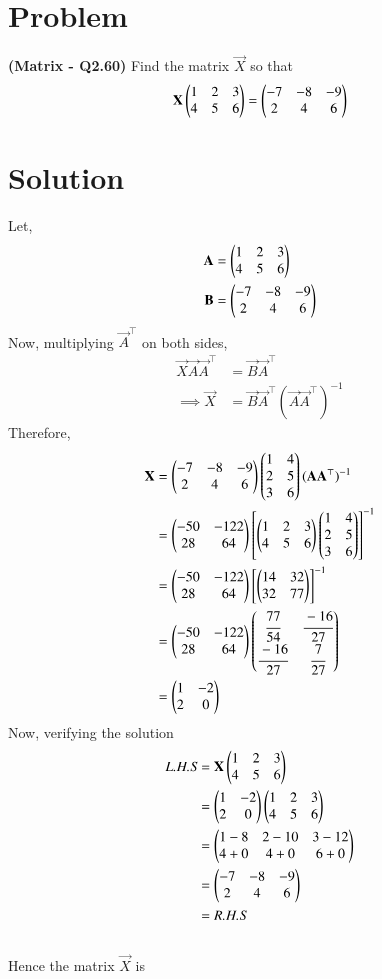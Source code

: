 \documentclass[journal,12pt,twocolumn]{IEEEtran}
\begin{document}
\section*{\textbf{Problem}}
\textbf{(Matrix - Q2.60)} Find the matrix $\vec{X}$ so that 
$$\mathbf{X}\begin{pmatrix}1 & 2 & 3\\ 4 & 5 & 6\end{pmatrix} = \begin{pmatrix}-7 & -8 & -9\\ 2 & 4 &6\end{pmatrix}$$
\section*{\textbf{Solution}}
Let,
\begin{align}
    \mathbf{A} &= \begin{pmatrix}1 & 2 & 3\\ 4 & 5 & 6\end{pmatrix}\\
    \mathbf{B} &= \begin{pmatrix}-7 & -8 & -9\\ 2 & 4 & 6\end{pmatrix}
\end{align}
Now, multiplying $\vec{A}^\top$ on both sides,
\begin{align}
    \vec{X}\vec{A}\vec{A}^\top &= \vec{B}\vec{A}^\top\\
   \implies \vec{X} &= \vec{B}\vec{A}^\top(\vec{A}\vec{A}^\top)^{-1}
\end{align}
Therefore,
\begin{align}
    \mathbf{X} &= \begin{pmatrix}-7 & -8 & -9\\ 2 & 4 & 6\end{pmatrix} \begin{pmatrix}1 & 4\\2 & 5\\3 & 6\end{pmatrix}(\mathbf{A}\mathbf{A}^\top)^{-1}\\
            &= \begin{pmatrix}-50 & -122\\ 28 & 64\end{pmatrix} \left[\begin{pmatrix}1 & 2 & 3\\ 4 & 5 & 6\end{pmatrix} \begin{pmatrix}1 & 4\\2 & 5\\3 & 6\end{pmatrix}\right]^{-1}\\
            &= \begin{pmatrix}-50 & -122\\ 28 & 64\end{pmatrix}\left[\begin{pmatrix}14 & 32\\32 & 77\end{pmatrix}\right]^{-1}\\
            &= \begin{pmatrix}-50 & -122\\ 28 & 64\end{pmatrix}\begin{pmatrix}\cfrac{77}{54}&\cfrac{-16}{27}\\ \cfrac{-16}{27}& \cfrac{7}{27}\end{pmatrix}\\
            &= \begin{pmatrix}1 & -2\\2 & 0\end{pmatrix}
\end{align}
Now, verifying the solution
\begin{align}
    \textit{L.H.S} &= \mathbf{X}\begin{pmatrix}1 & 2 & 3\\ 4 & 5 & 6\end{pmatrix}\\
                 &= \begin{pmatrix}1 & -2\\2 & 0\end{pmatrix}\begin{pmatrix}1 & 2 & 3\\ 4 & 5 & 6\end{pmatrix}\\
                 &= \begin{pmatrix}1-8 & 2-10 & 3-12\\4+0 & 4+0 & 6+0\end{pmatrix}\\
                 &= \begin{pmatrix}-7 & -8 & -9\\2 & 4 & 6\end{pmatrix}\\
                 &= \textit{R.H.S}
\end{align}\\
Hence the matrix $\vec{X}$ is 
\end{document}

